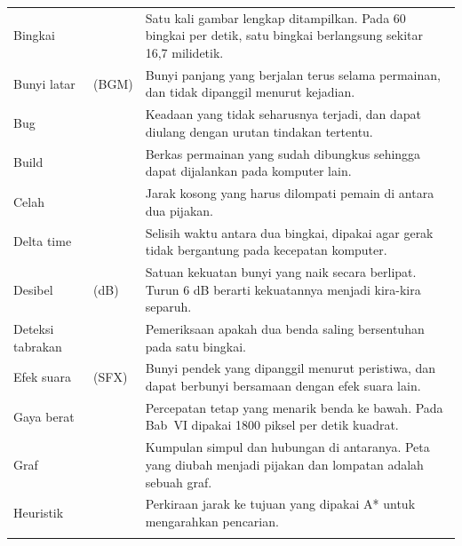 \begin{longtable}{@{}L{3.9cm} L{3.6cm} L{7.2cm}@{}}
Bingkai &  &
Satu kali gambar lengkap ditampilkan. Pada 60 bingkai per detik, satu bingkai
berlangsung sekitar 16,7 milidetik. \\ \addlinespace

Bunyi latar &  (BGM) &
Bunyi panjang yang berjalan terus selama permainan, dan tidak dipanggil
menurut kejadian. \\ \addlinespace

Bug &  &
Keadaan yang tidak seharusnya terjadi, dan dapat diulang dengan urutan
tindakan tertentu. \\ \addlinespace

Build &  &
Berkas permainan yang sudah dibungkus sehingga dapat dijalankan pada komputer
lain. \\ \addlinespace

Celah &  &
Jarak kosong yang harus dilompati pemain di antara dua pijakan. \\
\addlinespace

Delta time &  &
Selisih waktu antara dua bingkai, dipakai agar gerak tidak bergantung pada
kecepatan komputer. \\ \addlinespace

Desibel &  (dB) &
Satuan kekuatan bunyi yang naik secara berlipat. Turun 6 dB berarti kekuatannya
menjadi kira-kira separuh. \\ \addlinespace

Deteksi tabrakan &  &
Pemeriksaan apakah dua benda saling bersentuhan pada satu bingkai. \\
\addlinespace

Efek suara &  (SFX) &
Bunyi pendek yang dipanggil menurut peristiwa, dan dapat berbunyi bersamaan
dengan efek suara lain. \\ \addlinespace

Gaya berat &  &
Percepatan tetap yang menarik benda ke bawah. Pada Bab~VI dipakai 1800 piksel
per detik kuadrat. \\ \addlinespace

Graf &  &
Kumpulan simpul dan hubungan di antaranya. Peta yang diubah menjadi pijakan
dan lompatan adalah sebuah graf. \\ \addlinespace

Heuristik &  &
Perkiraan jarak ke tujuan yang dipakai A* untuk mengarahkan pencarian. \\
\addlinespace


\end{longtable}
